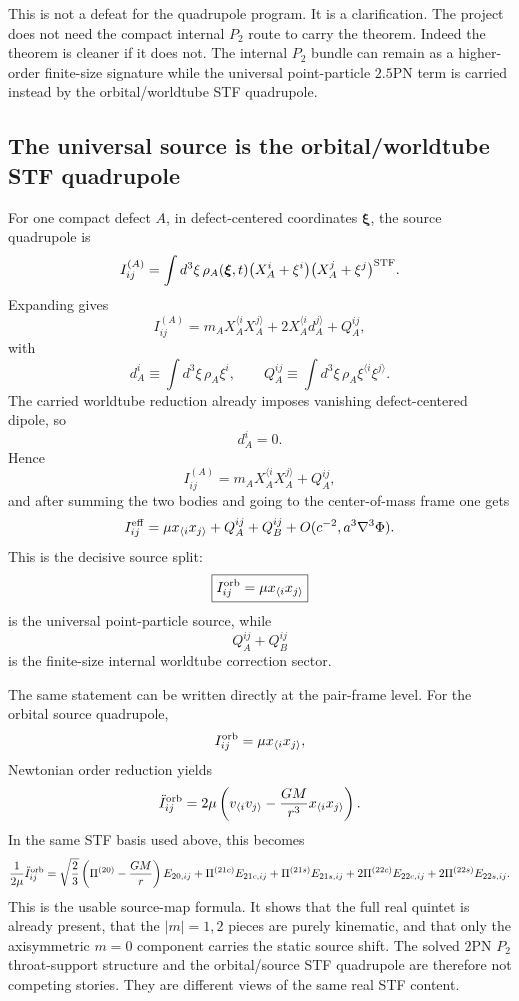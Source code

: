 \documentclass[11pt]{article}
\begin{document}
This is not a defeat for the quadrupole program.  It is a clarification.  The
project does not need the compact internal $P_2$ route to carry the theorem.
Indeed the theorem is cleaner if it does not.  The internal $P_2$ bundle can
remain as a higher-order finite-size signature while the universal point-particle
$2.5$PN term is carried instead by the orbital/worldtube STF quadrupole.

\subsection{The universal source is the orbital/worldtube STF quadrupole}
\label{sec:quadrupole-surviving-source-map}

For one compact defect $A$, in defect-centered coordinates $\boldsymbol\xi$, the
source quadrupole is
\[
I_{ij}^{(A)}
=
\int d^3\xi\,\rho_A(\boldsymbol\xi,t)
\bigl(X_A^i+\xi^i\bigr)\bigl(X_A^j+\xi^j\bigr)^{\rm STF}.
\]
Expanding gives
\[
I_{ij}^{(A)}
=
m_A X_A^{\langle i}X_A^{j\rangle}
+2X_A^{\langle i}d_A^{j\rangle}
+Q_A^{ij},
\]
with
\[
d_A^i\equiv\int d^3\xi\,\rho_A\xi^i,
\qquad
Q_A^{ij}\equiv\int d^3\xi\,\rho_A\xi^{\langle i}\xi^{j\rangle}.
\]
The carried worldtube reduction already imposes vanishing defect-centered dipole,
so
\[
d_A^i=0.
\]
Hence
\[
I_{ij}^{(A)}=m_A X_A^{\langle i}X_A^{j\rangle}+Q_A^{ij},
\]
and after summing the two bodies and going to the center-of-mass frame one gets
\[
I_{ij}^{\rm eff}
=
\mu x_{\langle i}x_{j\rangle}+Q_A^{ij}+Q_B^{ij}
+O(c^{-2},a^3\nabla^3\Phi).
\]
This is the decisive source split:
\[
\boxed{I_{ij}^{\rm orb}=\mu x_{\langle i}x_{j\rangle}}
\]
is the universal point-particle source, while
\[
Q_A^{ij}+Q_B^{ij}
\]
is the finite-size internal worldtube correction sector.

The same statement can be written directly at the pair-frame level.  For the
orbital source quadrupole,
\[
I_{ij}^{\rm orb}=\mu x_{\langle i}x_{j\rangle},
\]
Newtonian order reduction yields
\[
\ddot I_{ij}^{\rm orb}
=
2\mu\left(v_{\langle i}v_{j\rangle}-\frac{GM}{r^3}x_{\langle i}x_{j\rangle}\right).
\]
In the same STF basis used above, this becomes
\[
\frac{1}{2\mu}\ddot I_{ij}^{\rm orb}
=
\sqrt{\frac23}\left(\Pi^{(20)}-\frac{GM}{r}\right)E_{20,ij}
+\Pi^{(21c)}E_{21c,ij}
+\Pi^{(21s)}E_{21s,ij}
+2\Pi^{(22c)}E_{22c,ij}
+2\Pi^{(22s)}E_{22s,ij}.
\]
This is the usable source-map formula.  It shows that the full real quintet is
already present, that the $|m|=1,2$ pieces are purely kinematic, and that only
the axisymmetric $m=0$ component carries the static source shift.  The solved
$2$PN $P_2$ throat-support structure and the orbital/source STF quadrupole are
therefore not competing stories.  They are different views of the same real STF
content.
\end{document}

